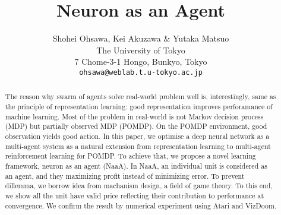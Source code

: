 \documentclass{article} %
\title{Neuron as an Agent}
\author{Shohei Ohsawa, Kei Akuzawa \& Yutaka Matsuo \\
The University of Tokyo\\
7 Chome-3-1 Hongo, Bunkyo, Tokyo \\
\texttt{ohsawa@weblab.t.u-tokyo.ac.jp} \\
}
\begin{document}
\maketitle

\begin{abstract}
The reason why swarm of agents solve real-world problem well is, interestingly,
same as the principle of representation learning: good representation improves
perforamance of machine learning. Most of the problem in real-world is not
Markov decision process (MDP) but partially observed MDP (POMDP). On the
POMDP environment, good observation yields good action. In this paper, we
optimise a deep neural network as a multi-agent system as a natural extension
from representation learning to multi-agent reinforcement learning for POMDP.
To achieve that, we propose a novel learning framework, neuron as an agent
(NaaA). In NaaA, an individual unit is considered as an agent, and they maximizing
profit instead of minimizing error. To prevent dillemma, we borrow idea
from machanism design, a field of game theory. To this end, we show all the unit
have valid price reflecting their contribution to performance at convergence. We
confirm the result by numerical experiment using Atari and VizDoom.
\end{abstract}











\end{document}

